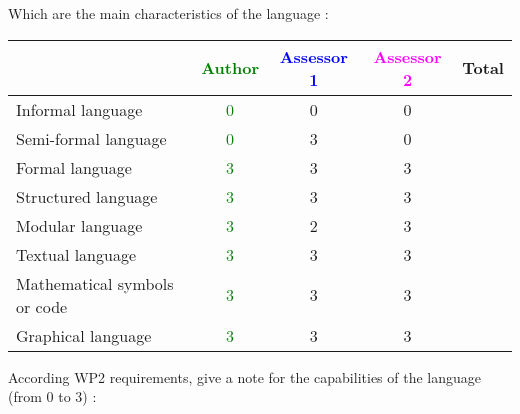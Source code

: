 Which are the main characteristics of the language :

\begin{tabular}{|l | c | c | c | c|}
\hline
& \textcolor{green}{Author} & \textcolor{blue}{Assessor 1} & \textcolor{magenta}{Assessor 2} & Total \\
\hline 
Informal language &  \textcolor{green}{0}  & 0 &0 &  \\
\hline 
Semi-formal language &  \textcolor{green}{0}  & 3 &0 &  \\
\hline
Formal language &  \textcolor{green}{3}  & 3 &3 &  \\
\hline
Structured language &  \textcolor{green}{3}  & 3 &3 & \\
\hline
Modular language &  \textcolor{green}{3}  & 2 &3 & \\
\hline
Textual language & \textcolor{green}{3} & 3 &3 & \\
\hline
Mathematical symbols or code & \textcolor{green}{3} & 3 &3 & \\
\hline
Graphical language & \textcolor{green}{3} & 3 &3 & \\
\hline
\end{tabular}

According WP2 requirements, give a note for the capabilities of the language (from 0 to 3) :


